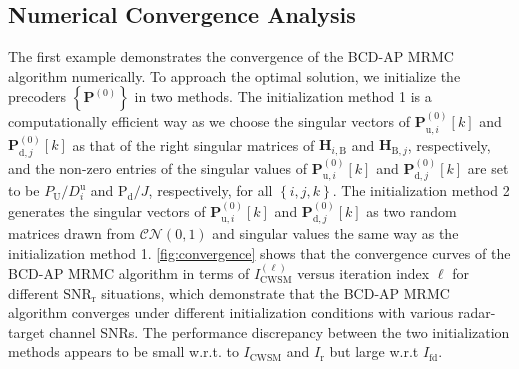 \documentclass[9pt,journal]{IEEEtran}
\newcommand{\paren}[1]{\left({#1}\right)}
\newcommand{\bracket}[1]{{\left [{#1}\right ]}}
\newcommand{\braces}[1]{{\left\{ {#1}\right\}}}
\newcommand{\rr}{_\mathrm{r}}
\newcommand{\HBj}{\mathbf{H}_{\textrm{B},j}}
\newcommand{\HiB}{\mathbf{H}_{i,\textrm{B}}}
\newcommand{\sfrac}[2]{#1/#2}
\theoremstyle{definition}
\begin{document}
\subsection{Numerical Convergence Analysis}
\label{sec:convergence}
The first example demonstrates the convergence of the BCD-AP MRMC algorithm numerically. To approach the optimal solution, we initialize the precoders $\braces{\mathbf{P}^{\paren{0}}}$ in two methods. The initialization method 1 is a computationally efficient way as we choose the singular vectors of  $\mathbf{P}^{\paren{0}}_{\textrm{u},i}\bracket{k}$ and $\mathbf{P}^{\paren{0}}_{\textrm{d},j}\bracket{k}$ as that of the right singular matrices of $\HiB$ and $\HBj$, respectively, and the non-zero entries of the singular values of $\mathbf{P}^{\paren{0}}_{\textrm{u},i}\bracket{k}$ and $\mathbf{P}^{\paren{0}}_{\textrm{d},j}\bracket{k}$ are set to be   $\sfrac{\mathit{P}_\textrm{U}}{D^\textrm{u}_i}$ and $\sfrac{\mathrm{P}_{\textrm{d}}}{\mathit{J}}$, respectively, for all $\braces{i,j,k}$. The initialization method 2 generates the singular vectors of $\mathbf{P}^{\paren{0}}_{\textrm{u},i}\bracket{k}$ and $\mathbf{P}^{\paren{0}}_{\textrm{d},j}\bracket{k}$ as two random matrices drawn from $\mathcal{CN}\paren{0,1}$ and singular values the same way as the initialization method 1. 
\figurename{\;\ref{fig:convergence}} shows that the convergence curves of the BCD-AP MRMC algorithm in terms of $\mathit{I}^{\paren{\ell}}_{\textrm{CWSM}}$ versus iteration index $\ell$ for different $\mathrm{SNR}_{\textrm{r}}$ situations, which demonstrate that the BCD-AP MRMC algorithm converges under different initialization conditions with various radar-target channel SNRs. The performance discrepancy between the two initialization methods appears to be small w.r.t. to $I_{\textrm{CWSM}}$ and $I_{\textrm{r}}$ but large w.r.t $I_{\textrm{fd}}$.  
\end{document}
